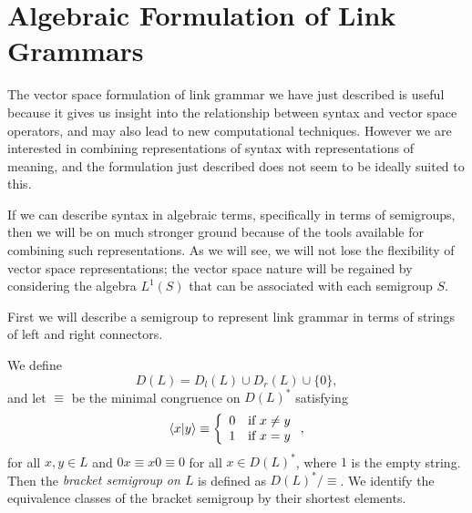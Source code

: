 \documentclass[12pt]{report}
\begin{document}




\section{Algebraic Formulation of Link Grammars}
\label{link}

The vector space formulation of link grammar we have just described is useful because it gives us insight into the relationship between syntax and vector space operators, and may also lead to new computational techniques. However we are interested in combining representations of syntax with representations of meaning, and the formulation just described does not seem to be ideally suited to this.

If we can describe syntax in algebraic terms, specifically in terms of semigroups, then we will be on much stronger ground because of the tools available for combining such representations. As we will see, we will not lose the flexibility of vector space representations; the vector space nature will be regained by considering the algebra $L^1(S)$ that can be associated with each semigroup $S$.

First we will describe a semigroup to represent link grammar in terms of strings of left and right connectors.
\begin{defn}
We define
$$D(L) = D_l(L) \cup D_r(L) \cup \{0\},$$
and let $\equiv$ be the minimal congruence on $D(L)^*$ satisfying
$$\langle x| y\rangle \equiv \left\{ \begin{array}{ll}
	0 & \text{if }x \neq y \\
	1 & \text{if }x = y
\end{array}\right.,$$
for all $x,y \in L$ and $0x \equiv x0 \equiv 0$ for all $x \in D(L)^*$, where $1$ is the empty string. Then the \emph{bracket semigroup on $L$} is defined as $D(L)^*/ \equiv$. We identify the equivalence classes of the bracket semigroup by their shortest elements.
\end{defn}
\end{document}
